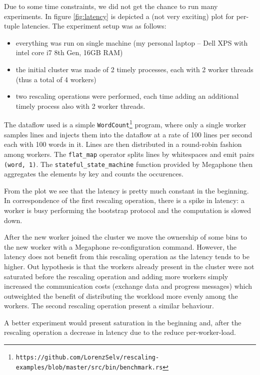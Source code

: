 \documentclass[12pt]{extarticle}
\begin{document}
Due to some time constraints, we did not get the chance to run many experiments. In figure \ref{fig:latency} is depicted
a (not very exciting) plot for per-tuple latencies. The experiment setup was as follows:
\begin{itemize}
    \item everything was run on single machine (my personal laptop -- Dell XPS with intel core i7 8th Gen, 16GB RAM)
    \item the initial cluster was made of 2 timely processes, each with 2 worker threads (thus a total of 4 workers)
    \item two rescaling operations were performed, each time adding an additional timely process also with 2 worker threads.
\end{itemize}

The dataflow used is a simple \verb|WordCount|\footnote{\verb|https://github.com/LorenzSelv/rescaling-examples/blob/master/src/bin/benchmark.rs|} program, where only a single worker samples lines and injects them into the dataflow at a rate of 100 lines per second each with 100 words in it.
Lines are then distributed in a round-robin fashion among workers. The \verb|flat_map| operator splits lines by
whitespaces and emit pairs \verb|(word, 1)|. The \verb|stateful_state_machine| function provided by Megaphone then aggregates the elements by key and counts the occurences.

\vspace{3mm}

From the plot we see that the latency is pretty much constant in the beginning. In correspondence of the first rescaling operation,
there is a spike in latency: a worker is busy performing the bootstrap protocol and the computation is slowed down.

After the new worker joined the cluster we move the ownership of some bins to the new worker with a Megaphone re-configuration command.
However, the latency does not benefit from this rescaling operation as the latency tends to be higher. Out hypothesis is that
the workers already present in the cluster were not saturated before the rescaling operation and adding more workers simply 
increased the communication costs (exchange data and progress messages) which outweighted the benefit of distributing
the workload more evenly among the workers. The second rescaling operation present a similar behaviour.

A better experiment would present saturation in the beginning and, after the rescaling operation a decrease in latency due to the reduce per-worker-load.
\end{document}
